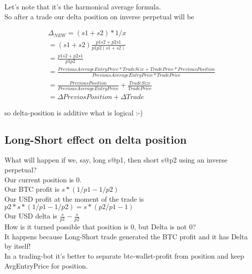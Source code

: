 \documentclass{article}
\begin{document}
Let's note that it's the harmonical average formula. \\

So after a trade our delta position on inverse perpetual will be

\begin{align*}
& \Delta_{NEW} = (s1 + s2) * 1 / x \\
& = (s1 + s2) \frac{p1 s2 + p2 s1}{p1 p2 (s1 + s2)} \\
& = \frac{p1 s2 + p2 s1}{p1 p2} \\
& = \frac{PreviousAverageEntryPrice * TradeSize + TradePrice * PreviousPosition}{PreviousAverageEntryPrice * TradePrice} \\
& = \frac{PreviousPosition}{PreviousAverageEntryPrice} + \frac{TradeSize}{TradePrice} \\ 
& = \Delta PreviosPosition + \Delta Trade
\end{align*}

so delta-position is additive what is logical :-) \\

\subsection{Long-Short effect on delta position}

What will happen if we, say, long s@p1, then short s@p2 using an inverse perpetual? \\

Our current position is 0. \\

Our BTC profit is $ s * (1/p1-1/p2) $ \\

Our USD profit at the moment of the trade is $ p2 * s * (1/p1-1/p2) = s * (p2/p1 - 1) $ \\

Our USD delta is $ \frac{s}{p1} - \frac{s}{p2} $ \\

How is it turned possible that position is 0, but Delta is not 0? \\

It happens because Long-Short trade generated the BTC profit and it has Delta by itself! \\

In a trading-bot it's better to separate btc-wallet-profit from position and keep AvgEntryPrice for position.
\end{document}
